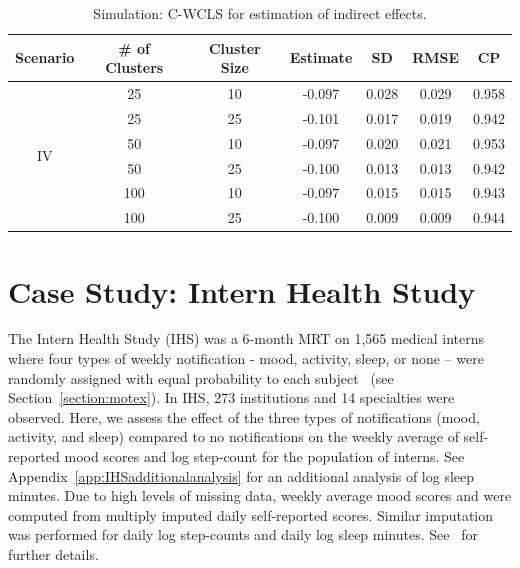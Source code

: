 \documentclass[12pt]{article}
\begin{document}
\begin{table}[!th]
\centering
\begin{tabular}{c | cccccc}
\hline
Scenario & \# of Clusters & Cluster Size & Estimate & SD & RMSE & CP \\ \hline
\multirow{6}{*}{IV} & 25 & 10 & -0.097 & 0.028 & 0.029 & 0.958 \\
& 25 & 25 & -0.101 & 0.017 &  0.019 & 0.942 \\
& 50 & 10 & -0.097 & 0.020 & 0.021 & 0.953 \\
& 50 & 25 & -0.100 & 0.013 & 0.013 & 0.942 \\
& 100 & 10 & -0.097 & 0.015 & 0.015 & 0.943 \\
& 100 & 25 &  -0.100 & 0.009 & 0.009 & 0.944 \\ \hline
\end{tabular}
\caption{Simulation: C-WCLS for estimation of indirect effects.}
\label{tab:simresults_indirect}

\end{table}

\section{Case Study: Intern Health Study}
\label{section:casestudy}

The Intern Health Study (IHS) was a 6-month MRT on 1,565 medical interns where four types of weekly notification - mood, activity, sleep, or none -- were randomly assigned with equal probability to each subject~\cite{Necamp2020} (see Section~\ref{section:motex}).
In IHS,  273 institutions and 14 specialties were observed.   Here, we assess the effect of the three types of notifications (mood, activity, and sleep) compared to no notifications on the weekly average of self-reported mood scores and log step-count  for the population of interns.  See Appendix~\ref{app:IHSadditionalanalysis} for an additional analysis of log sleep minutes.  Due to high levels of missing data, weekly average mood scores and were computed from multiply imputed daily self-reported scores.  Similar imputation was performed for daily log step-counts and daily log sleep minutes. See~\cite{Necamp2020} for further details.
\end{document}
